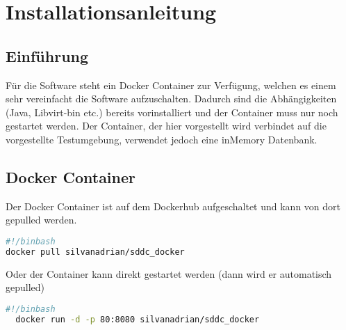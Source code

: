 \chapter{Installationsanleitung}
\section{Einführung}
Für die Software steht ein Docker Container zur Verfügung, welchen es einem sehr 
vereinfacht die Software aufzuschalten.
Dadurch sind die Abhängigkeiten (Java, Libvirt-bin etc.) bereits vorinstalliert 
und der Container muss nur noch gestartet werden.
Der Container, der hier vorgestellt wird verbindet auf die vorgestellte 
Testumgebung, verwendet jedoch eine inMemory Datenbank.

\section{Docker Container}
Der Docker Container ist auf dem Dockerhub aufgeschaltet und kann von dort 
gepulled werden.
\begin{lstlisting}[style=BASH,language=bash,caption={Pull Docker Container}]
#!/binbash
docker pull silvanadrian/sddc_docker
\end{lstlisting}
Oder der Container kann direkt gestartet werden (dann wird er automatisch gepulled)

\begin{lstlisting}[style=Bash,language=bash,caption={Run Docker Container}]
  #!/binbash
  docker run -d -p 80:8080 silvanadrian/sddc_docker
\end{lstlisting}